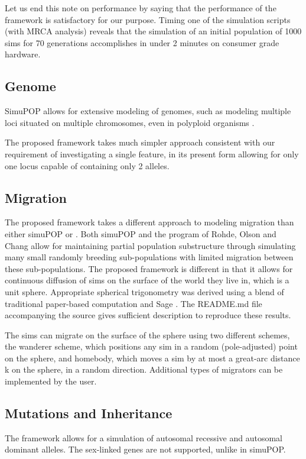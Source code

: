 \documentclass{l4proj}
\begin{document}
Let us end this note on performance by saying that the performance of the framework is satisfactory for our purpose. Timing one of the simulation scripts (with MRCA analysis) reveals that the simulation of an initial population of 1000 sims for 70 generations accomplishes in under 2 minutes on consumer grade hardware.

\subsection{Genome}
SimuPOP allows for extensive modeling of genomes, such as modeling multiple loci situated on multiple \gls{chromosome}s, even in \gls{polyploid} organisms \parencite{simuPOP16}.

The proposed framework takes much simpler approach consistent with our requirement of investigating a single feature, in its present form allowing for only one \gls{locus} capable of containing only 2 alleles.

\subsection{Migration}
The proposed framework takes a different approach to modeling migration than either simuPOP or \cite{rohde04}. Both simuPOP and the program of Rohde, Olson and Chang allow for maintaining partial population substructure through simulating many small randomly breeding sub-populations with limited migration between these sub-populations. The proposed framework is different in that it allows for continuous diffusion of sims on the surface of the world they live in, which is a unit sphere. Appropriate spherical trigonometry was derived using a blend of traditional paper-based computation and Sage \parencite{sage14}. The README.md file accompanying the source gives sufficient description to reproduce these results.

The sims can migrate on the surface of the sphere using two different schemes, the wanderer scheme, which positions any sim in a random (pole-adjusted) point on the sphere, and homebody, which moves a sim by at most a great-arc distance k on the sphere, in a random direction. Additional types of migrators can be implemented by the user.

\subsection{Mutations and Inheritance}

The framework allows for a simulation of \gls{autosomal} recessive and \gls{autosomal} dominant alleles. The \gls{sex-linked} genes are not supported, unlike in simuPOP.
\end{document}

